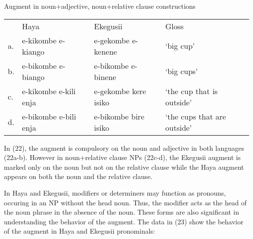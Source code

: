 \documentclass[output=paper]{langscibook}
\begin{document}
\begin{exe}
\ex Augment in noun+adjective, noun+relative clause constructions \\
\label{hayagusii22}
\begin{tabular}{llll}
        &     Haya		&		Ekegusii &			Gloss		 \\
a. &	e-kikombe e-kiango	&	e-gekombe e-kenene	&	‘big cup’\\
b.& e-bikombe e-biango	&	e-bikombe e-binene	&	‘big cups’\\
c.	& e-kikombe e-kili enja	&	e-gekombe kere isiko	&	‘the cup that is outside’\\
d.	& e-bikombe e-bili enja	&	e-bikombe bire isiko	&	‘the cups that are outside’\\

\end{tabular}
\end{exe}
In (22), the augment is compulsory on the noun and adjective in both languages (22a-b). However in noun+relative clause NPs (22c-d), the Ekegusii augment is marked only on the noun but not on the relative clause while the Haya augment appears on both the noun and the relative clause.

	In Haya and Ekegusii, modifiers or determiners may function as pronouns, occuring in an NP without the head noun. Thus, the modifier acts as the head of the noun phrase in the absence of the noun. These forms are also significant in understanding the behavior of the augment. The data in (23) show the behavior of the augment in Haya and Ekegusii pronominals:
\end{document}
